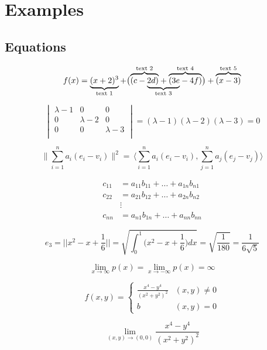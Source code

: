 \section{Examples}
\subsection{Equations}
\[
  f(x) = 
    \underbrace{(x + 2)^3}_\text{text 1} + 
    \bigl(
      \mathrlap{\overbrace{\phantom{(c - 2d)}}^{\text{text 2}}}
      (c - 
      \mathrlap{\underbrace{\phantom{2d) + (3e}}_{\text{text 3}}}
      2d) +
      \overbrace{(3e - 4f)}^{\text{text 4}}
    \bigr) + 
    \overbrace{(x - 3)}^\text{text 5}
\]

$$\begin{vmatrix}
	\lambda -1 		& 0 				& 0				\\
	0 				& \lambda -2		& 0				\\
	0 				& 0 				& \lambda-3		\\
	\end{vmatrix}
=(\lambda-1)(\lambda-2)(\lambda-3)=0$$

\begin{equation*}
	\Big\|\sum_{i=1}^na_i(e_i-v_i)\Big\|^2=\,\Big\langle \sum_{i=1}^n a_i(e_i-v_i),\sum_{j=1}^n a_j(e_j-v_j)\Big\rangle
\end{equation*} 

\begin{equation} 
    \begin{split} 
    c_{11}& = a_{11}b_{11}+\dots+a_{1n}b_{n1}\\
    c_{22}&= a_{21} b_{12} +\dots+a_{2n} b_{n2} \\
    &\vdots\\
    c_{nn} & = a_{n1} b_{1n} +\dots+a_{nn}b_{nn}
    \end{split} 
\end{equation} 

\[
	e_3=\Big|\Big|x^2-x+\dfrac{1}{6}\Big|\Big|=\sqrt{\displaystyle \int_{0}^{1}\Big(x^2-x+\dfrac{1}{6}\Big)dx}=\sqrt{\dfrac{1}{180}}=\dfrac{1}{6\sqrt{5}}
\]

$$\lim_{x \to \infty}p(x) = \lim_{x \to -\infty}p(x) = \infty$$

\[
	f(x,y) =
	\begin{cases} 
		\frac{x^4 - y^4}{(x^2 + y^2)^2} & (x,y) \neq 0 \\
		b 								& (x,y) = 0
	\end{cases}
\]

\[
\lim_{(x,y)\to(0,0)}\frac{x^4-y^4}{(x^2+y^2)^2}
\]

